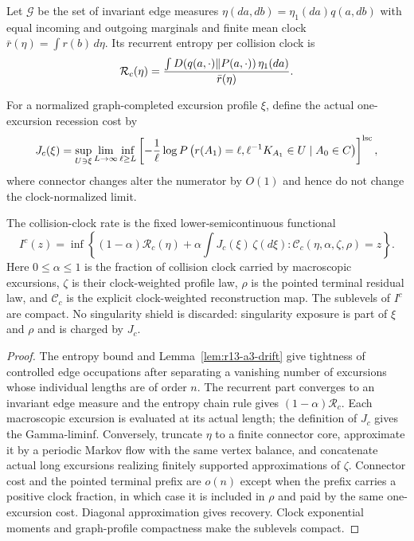 Let $\mathcal G$ be the set of invariant edge measures
$\eta(da,db)=\eta_1(da)q(a,db)$ with equal incoming and outgoing marginals and
finite mean clock
$\bar r(\eta)=\int r(b)\,d\eta$.  Its recurrent entropy per collision clock is
\[
 \mathcal R_c(\eta)
 ={\int D(q(a,\cdot)\Vert P(a,\cdot))\,\eta_1(da)
   \over \bar r(\eta)}.
\]

For a normalized graph-completed excursion profile $\xi$, define the actual
one-excursion recession cost by
\[
 J_c(\xi)=
 \sup_{U\ni\xi}\lim_{L\to\infty}
 \inf_{\ell\ge L}
 \left[-{1\over\ell}\log
 P\left(r(A_1)=\ell,
       \ell^{-1}K_{A_1}\in U\mid A_0\in C\right)
 \right]^{\rm lsc},
\]
where connector changes alter the numerator by $O(1)$ and hence do not change
the clock-normalized limit.

\begin{theorem}
\label{thm:r13-a3-rate}
The collision-clock rate is the fixed lower-semicontinuous functional
\[
 I^c(z)=\inf\left\{
 (1-\alpha)\mathcal R_c(\eta)+
 \alpha\int J_c(\xi)\,\zeta(d\xi):
 \mathcal C_c(\eta,\alpha,\zeta,\rho)=z
 \right\}.
\]
Here $0\le\alpha\le1$ is the fraction of collision clock carried by
macroscopic excursions, $\zeta$ is their clock-weighted profile law, $\rho$
is the pointed terminal residual law, and $\mathcal C_c$ is the explicit
clock-weighted reconstruction map.  The sublevels of $I^c$ are compact.
No singularity shield is discarded: singularity exposure is part of
$\xi$ and $\rho$ and is charged by $J_c$.
\end{theorem}

\begin{proof}
The entropy bound and Lemma~\ref{lem:r13-a3-drift} give tightness of controlled
edge occupations after separating a vanishing number of excursions whose
individual lengths are of order $n$.  The recurrent part converges to an
invariant edge measure and the entropy chain rule gives
$(1-\alpha)\mathcal R_c$.  Each macroscopic excursion is evaluated at its
actual length; the definition of $J_c$ gives the Gamma-liminf.  Conversely,
truncate $\eta$ to a finite connector core, approximate it by a periodic
Markov flow with the same vertex balance, and concatenate actual long
excursions realizing finitely supported approximations of $\zeta$.  Connector
cost and the pointed terminal prefix are $o(n)$ except when the prefix carries
a positive clock fraction, in which case it is included in $\rho$ and paid by
the same one-excursion cost.  Diagonal approximation gives recovery.  Clock
exponential moments and graph-profile compactness make the sublevels compact.
\end{proof}

